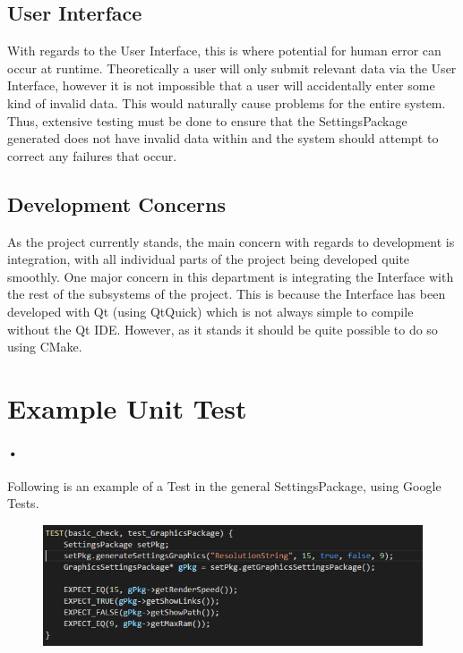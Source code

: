 \documentclass[11pt]{article}
\begin{document}
\subsection{User Interface}
With regards to the User Interface, this is where potential for human error can occur at runtime. Theoretically a user will only submit relevant data via the User Interface, however it is not impossible that a user will accidentally enter some kind of invalid data. This would naturally cause problems for the entire system.
\newline Thus, extensive testing must be done to ensure that the SettingsPackage generated does not have invalid data within and the system should attempt to correct any failures that occur.
\subsection{Development Concerns}
As the project currently stands, the main concern with regards to development is integration, with all individual parts of the project being developed quite smoothly. One major concern in this department is integrating the Interface with the rest of the subsystems of the project. This is because the Interface has been developed with Qt (using QtQuick) which is not always simple to compile without the Qt IDE. However, as it stands it should be quite possible to do so using CMake.

\section{Example Unit Test}
\paragraph{•}
Following is an example of a Test in the general SettingsPackage, using Google Tests.
\begin{figure}[h]
\includegraphics[scale=0.7]{GTest.png}
\end{figure}
\end{document}
